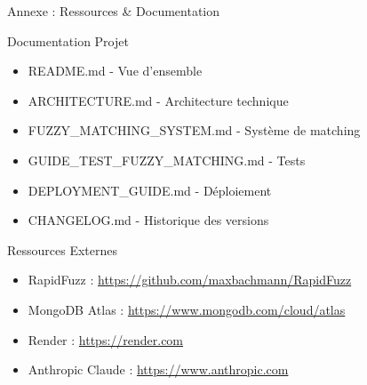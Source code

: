 \documentclass[aspectratio=169]{beamer}
\begin{document}
\begin{frame}{Annexe : Ressources \& Documentation}
    \begin{block}{Documentation Projet}
        \begin{itemize}
            \item README.md - Vue d'ensemble
            \item ARCHITECTURE.md - Architecture technique
            \item FUZZY\_MATCHING\_SYSTEM.md - Système de matching
            \item GUIDE\_TEST\_FUZZY\_MATCHING.md - Tests
            \item DEPLOYMENT\_GUIDE.md - Déploiement
            \item CHANGELOG.md - Historique des versions
        \end{itemize}
    \end{block}

    \begin{block}{Ressources Externes}
        \begin{itemize}
            \item RapidFuzz : \url{https://github.com/maxbachmann/RapidFuzz}
            \item MongoDB Atlas : \url{https://www.mongodb.com/cloud/atlas}
            \item Render : \url{https://render.com}
            \item Anthropic Claude : \url{https://www.anthropic.com}
        \end{itemize}
    \end{block}
\end{frame}
\end{document}
